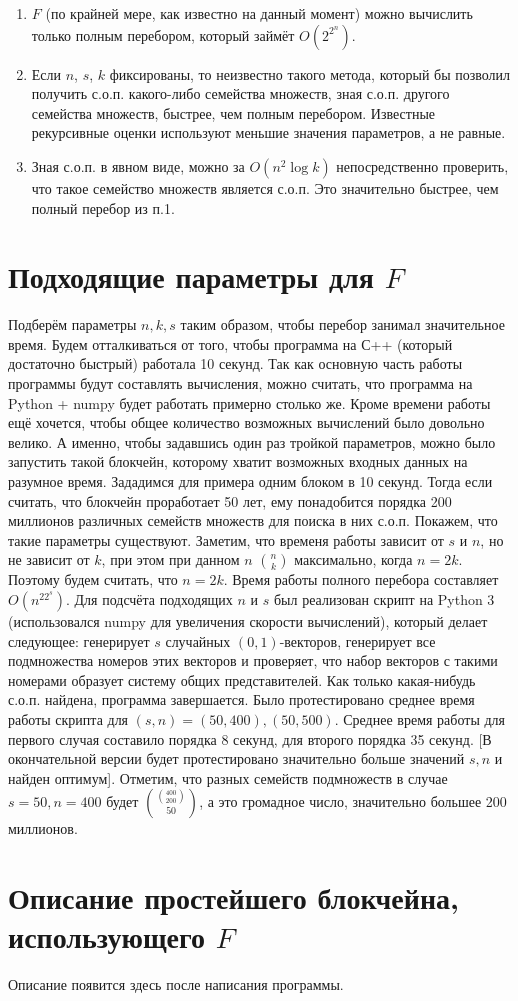 \documentclass{article}
\begin{document}
\begin{enumerate}
\item $F$ (по крайней мере, как известно на данный момент) можно вычислить только полным перебором, который займёт $O(2^{2^n})$. 
\item Если $n$, $s$, $k$ фиксированы, то неизвестно такого метода, который бы позволил получить с.о.п. какого-либо семейства множеств, зная с.о.п. другого семейства множеств, быстрее, чем полным перебором. Известные рекурсивные оценки используют меньшие значения параметров, а не равные.
\item Зная с.о.п. в явном виде, можно за $O(n^2 \log k)$ непосредственно проверить, что такое семейство множеств является с.о.п. Это значительно быстрее, чем полный перебор из п.1.
\end{enumerate}

\section{Подходящие параметры для $F$}

    Подберём параметры $n, k, s$ таким образом, чтобы перебор занимал значительное время. Будем отталкиваться от того, чтобы программа на С++ (который достаточно быстрый) работала 10 секунд. Так как основную часть работы программы будут составлять вычисления, можно считать, что программа на Python + numpy будет работать примерно столько же.
    Кроме времени работы ещё хочется, чтобы общее количество возможных вычислений было довольно велико. А именно, чтобы задавшись один раз тройкой параметров, можно было запустить такой блокчейн, которому хватит возможных входных данных на разумное время. Зададимся для примера одним блоком в 10 секунд. Тогда если считать, что блокчейн проработает 50 лет, ему понадобится порядка 200 миллионов различных семейств множеств для поиска в них с.о.п.
    Покажем, что такие параметры существуют. Заметим, что временя работы зависит от $s$ и $n$, но не зависит от $k$, при этом при данном $n$ $n \choose k$ максимально, когда $n = 2k$. Поэтому будем считать, что $n = 2k$. Время работы полного перебора составляет $O(n^22^s)$.
    Для подсчёта подходящих $n$ и $s$ был реализован скрипт на Python 3 (использовался numpy для увеличения скорости вычислений), который делает следующее: генерирует $s$ случайных $(0, 1)$-векторов, генерирует все подмножества номеров этих векторов и проверяет, что набор векторов с такими номерами образует систему общих представителей. Как только какая-нибудь с.о.п. найдена, программа завершается. 
    Было протестировано среднее время работы скрипта для $(s, n) = (50, 400), (50, 500)$. Среднее время работы для первого случая составило порядка 8 секунд, для второго порядка 35 секунд. [В окончательной версии будет протестировано значительно больше значений $s, n$ и найден оптимум].
    Отметим, что разных семейств подмножеств в случае $s = 50, n = 400$ будет ${400 \choose 200} \choose {50} $, а это громадное число, значительно большее 200 миллионов.
\section{Описание простейшего блокчейна, использующего $F$}

Описание появится здесь после написания программы.
\end{document}
